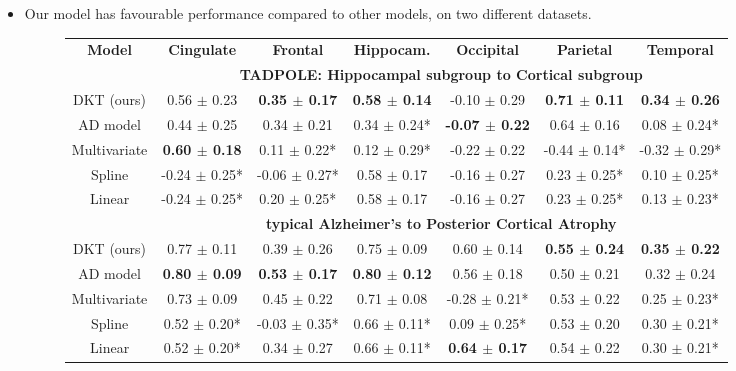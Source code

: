 \documentclass[portrait,a0,final,20pt]{a0poster}
\newcommand{\fnt}[1]{\LARGE{#1}}
\begin{document}
{\begin{multicols}{2}
\begin{itemize}
\item \fnt{Our model has favourable performance compared to other models, on two different datasets.}
\vspace{0.3em}
\begin{figure}[H]
\fontsize{27}{30}\selectfont
\begin{tabular}{c | c c c c c c}
\textbf{Model} & \textbf{Cingulate} & \textbf{Frontal} & \textbf{Hippocam.} & \textbf{Occipital} & \textbf{Parietal} & \textbf{Temporal}\\
& \multicolumn{6}{c}{\textbf{TADPOLE: Hippocampal subgroup to Cortical subgroup}}\\
DKT (ours) &      0.56 $\pm$ 0.23 &    \textbf{0.35 $\pm$ 0.17} &        \textbf{0.58 $\pm$ 0.14} &     -0.10 $\pm$ 0.29 &     \textbf{0.71 $\pm$ 0.11} &     \textbf{0.34 $\pm$ 0.26} \\
AD model &      0.44 $\pm$ 0.25 &    0.34 $\pm$ 0.21 &       0.34 $\pm$ 0.24* &     \textbf{-0.07 $\pm$ 0.22} &     0.64 $\pm$ 0.16 &    0.08 $\pm$ 0.24* \\
Multivariate &      \textbf{0.60 $\pm$ 0.18} &   0.11 $\pm$ 0.22* &       0.12 $\pm$ 0.29* &     -0.22 $\pm$ 0.22 &   -0.44 $\pm$ 0.14* &   -0.32 $\pm$ 0.29* \\
Spline &    -0.24 $\pm$ 0.25* &  -0.06 $\pm$ 0.27* &        0.58 $\pm$ 0.17 &     -0.16 $\pm$ 0.27 &    0.23 $\pm$ 0.25* &    0.10 $\pm$ 0.25* \\
Linear &    -0.24 $\pm$ 0.25* &   0.20 $\pm$ 0.25* &        0.58 $\pm$ 0.17 &     -0.16 $\pm$ 0.27 &    0.23 $\pm$ 0.25* &    0.13 $\pm$ 0.23* \\
& \multicolumn{6}{c}{\textbf{typical Alzheimer's to Posterior Cortical Atrophy}}\\
DKT (ours) &    0.77 $\pm$ 0.11 &    0.39 $\pm$ 0.26 &      0.75 $\pm$ 0.09 &    0.60 $\pm$ 0.14 &    \textbf{0.55 $\pm$ 0.24} &    \textbf{0.35 $\pm$ 0.22} \\
AD model &    \textbf{0.80 $\pm$ 0.09} &    \textbf{0.53 $\pm$ 0.17} &      \textbf{0.80 $\pm$ 0.12} &    0.56 $\pm$ 0.18 &    0.50 $\pm$ 0.21 &    0.32 $\pm$ 0.24 \\
Multivariate &   0.73 $\pm$ 0.09 &   0.45 $\pm$ 0.22  &    0.71 $\pm$ 0.08 & -0.28 $\pm$ 0.21* &  0.53 $\pm$ 0.22  &  0.25 $\pm$ 0.23* \\
Spline &   0.52 $\pm$ 0.20* &  -0.03 $\pm$ 0.35* &     0.66 $\pm$ 0.11* &   0.09 $\pm$ 0.25* &    0.53 $\pm$ 0.20 &   0.30 $\pm$ 0.21* \\
Linear &   0.52 $\pm$ 0.20* &    0.34 $\pm$ 0.27 &     0.66 $\pm$ 0.11* &    \textbf{0.64 $\pm$ 0.17} &    0.54 $\pm$ 0.22 &   0.30 $\pm$ 0.21* \\
\end{tabular}
\vspace{0.5em}
\label{sec:dktPerfMetrics}
\end{figure}



\end{itemize}
\end{multicols}}
\end{document}
